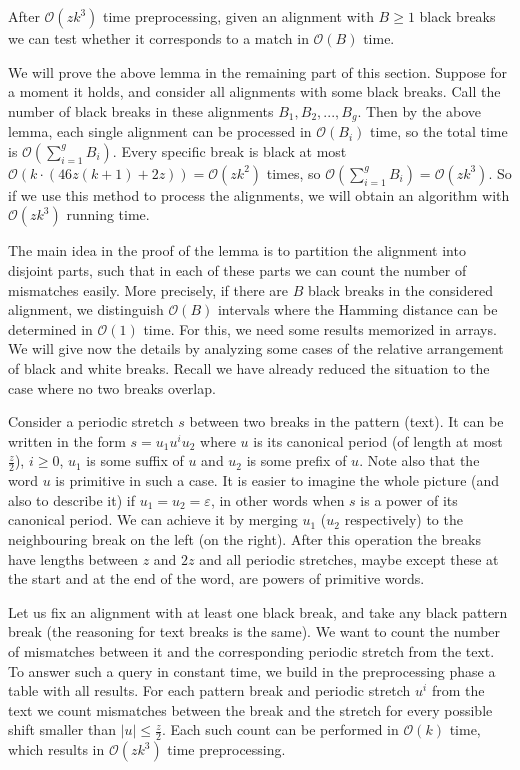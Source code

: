 \documentclass[runningheads]{llncs}
\begin{document}
\begin{lemma}\label{lemma:fast_alignments}
After $\mathcal{O}(zk^3)$ time preprocessing, given an alignment with $B\geq 1$ black breaks we can test whether it corresponds to a match in $\mathcal{O}(B)$ time.
\end{lemma}
We will prove the above lemma in the remaining part of this section. Suppose for a moment it holds, and consider all alignments with some black breaks. Call the number of black breaks in these alignments $B_1, B_2, ..., B_g$. Then by the above lemma, each single alignment can be processed in $\mathcal{O}(B_i)$ time, so the total time is $\mathcal{O}(\sum_{i=1}^{g}B_i)$. Every specific break is black at most $\mathcal{O}(k\cdot (46z(k+1)+2z))=\mathcal{O}(zk^2)$ times, so $\mathcal{O}(\sum_{i=1}^{g}B_i)=\mathcal{O}(zk^3)$. So if we use this method to process the alignments, we will obtain an algorithm with $\mathcal{O}(zk^3)$ running time.

The main idea in the proof of the lemma is to partition the alignment into disjoint parts, such that in each of these parts we can count the number of mismatches easily. More precisely, if there are $B$ black breaks in the considered alignment, we distinguish $\mathcal{O}(B)$ intervals where the Hamming distance can be determined in $\mathcal{O}(1)$ time. For this, we need some results memorized in arrays. We will give now the details by analyzing some cases of the relative arrangement of black and white breaks. Recall we have already reduced the situation to the case where no two breaks overlap.

Consider a periodic stretch $s$ between two breaks in the pattern (text). It can be written in the form $s=u_1u^iu_2$ where $u$ is its canonical period (of length at most $\frac{z}{2}$), $i\geq 0$, $u_1$ is some suffix of $u$ and $u_2$ is some prefix of $u$. Note also that the word $u$ is primitive in such a case. It is easier to imagine the whole picture (and also to describe it) if $u_1=u_2=\varepsilon$, in other words when $s$ is a power of its canonical period. We can achieve it by merging $u_1$ ($u_2$ respectively) to the neighbouring break on the left (on the right). After this operation the breaks have lengths between $z$ and $2z$ and all periodic stretches, maybe except these at the start and at the end of the word, are powers of primitive words.

Let us fix an alignment with at least one black break, and take any black pattern break (the reasoning for text breaks is the same). We want to count the number of mismatches between it and the corresponding periodic stretch from the text. To answer such a query in constant time, we build in the preprocessing phase a table with all results. For each pattern break and periodic stretch $u^{i}$ from the text we count mismatches between the break and the stretch for every possible shift smaller than $|u|\leq\frac{z}{2}$. Each such count can be performed in $\mathcal{O}(k)$ time, which results in $\mathcal{O}(zk^3)$ time preprocessing.
\end{document}
